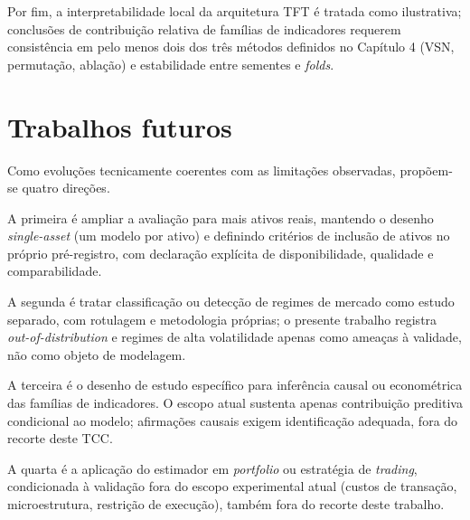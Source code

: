 Por fim, a interpretabilidade local da arquitetura TFT é tratada como ilustrativa; conclusões de contribuição relativa de famílias de indicadores requerem consistência em pelo menos dois dos três métodos definidos no Capítulo 4 (VSN, permutação, ablação) e estabilidade entre sementes e \textit{folds}.

\section{Trabalhos futuros}
Como evoluções tecnicamente coerentes com as limitações observadas, propõem-se quatro direções.

A primeira é ampliar a avaliação para mais ativos reais, mantendo o desenho \textit{single-asset} (um modelo por ativo) e definindo critérios de inclusão de ativos no próprio pré-registro, com declaração explícita de disponibilidade, qualidade e comparabilidade.

A segunda é tratar classificação ou detecção de regimes de mercado como estudo separado, com rotulagem e metodologia próprias; o presente trabalho registra \textit{out-of-distribution} e regimes de alta volatilidade apenas como ameaças à validade, não como objeto de modelagem.

A terceira é o desenho de estudo específico para inferência causal ou econométrica das famílias de indicadores. O escopo atual sustenta apenas contribuição preditiva condicional ao modelo; afirmações causais exigem identificação adequada, fora do recorte deste TCC.

A quarta é a aplicação do estimador em \textit{portfolio} ou estratégia de \textit{trading}, condicionada à validação fora do escopo experimental atual (custos de transação, microestrutura, restrição de execução), também fora do recorte deste trabalho.
